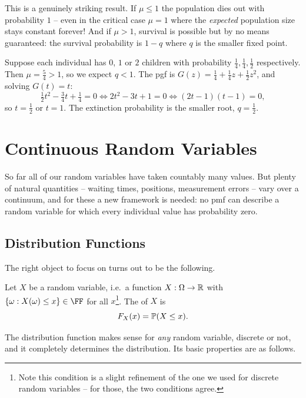 \documentclass[a4paper]{scrartcl}
\begin{document}
This is a genuinely striking result. If $\mu \leq 1$ the population dies out with probability $1$ -- even in the critical case $\mu = 1$ where the \emph{expected} population size stays constant forever! And if $\mu > 1$, survival is possible but by no means guaranteed: the survival probability is $1 - q$ where $q$ is the smaller fixed point.

\begin{example}
	Suppose each individual has $0$, $1$ or $2$ children with probability $\frac14, \frac14, \frac12$ respectively. Then $\mu = \frac54 > 1$, so we expect $q < 1$. The pgf is $G(z) = \frac14 + \frac14 z + \frac12 z^2$, and solving $G(t) = t$:
	$$
	\tfrac12 t^2 - \tfrac34 t + \tfrac14 = 0 \iff 2t^2 - 3t + 1 = 0 \iff (2t - 1)(t - 1) = 0,
	$$
	so $t = \frac12$ or $t = 1$. The extinction probability is the smaller root, $q = \frac{1}{2}$.
\end{example}


\section{Continuous Random Variables}

So far all of our random variables have taken countably many values. But plenty of natural quantities -- waiting times, positions, measurement errors -- vary over a continuum, and for these a new framework is needed: no pmf can describe a random variable for which every individual value has probability zero.

\subsection{Distribution Functions}

The right object to focus on turns out to be the following.

\begin{definition}
	Let $X$ be a random variable, i.e.\ a function $X: \Omega \rightarrow \mathbb{R}$ with $\{\omega : X(\omega) \leq x\} \in \FF$ for all $x$\footnote{Note this condition is a slight refinement of the one we used for discrete random variables -- for those, the two conditions agree.}. The  of $X$ is
	$$
	F_X(x) = \mathbb{P}(X \leq x).
	$$
\end{definition}

The distribution function makes sense for \emph{any} random variable, discrete or not, and it completely determines the distribution. Its basic properties are as follows.
\end{document}

